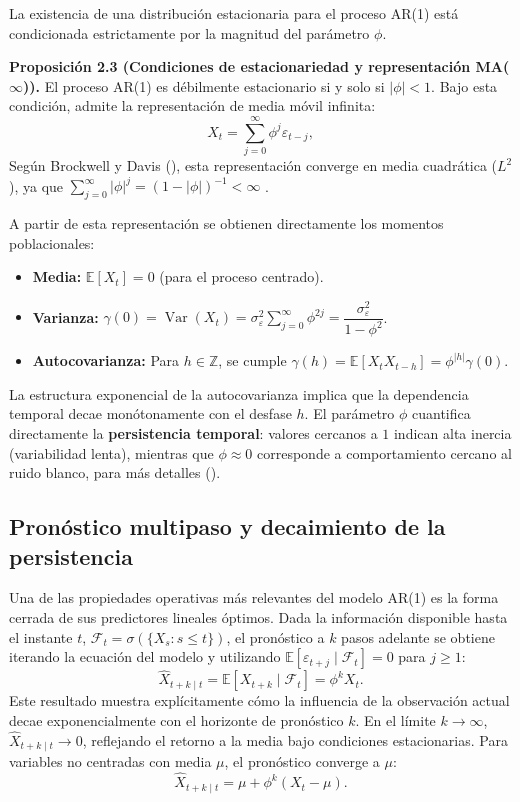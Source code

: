 \documentclass[
  spanish,
  us-letterpaper,
]{scrreprt}
\providecommand{\tightlist}{%
  \setlength{\itemsep}{0pt}\setlength{\parskip}{0pt}}
\numberwithin{equation}{section}
\begin{document}
La existencia de una distribución estacionaria para el proceso AR(1)
está condicionada estrictamente por la magnitud del parámetro \(\phi\).

\textbf{Proposición 2.3 (Condiciones de estacionariedad y representación
MA(\(\infty\))).} El proceso AR(1) es débilmente estacionario si y solo
si \(|\phi| < 1\). Bajo esta condición, admite la representación de
media móvil infinita: \[
X_t = \sum_{j=0}^\infty \phi^j \varepsilon_{t-j},
\] Según Brockwell y Davis (),
esta representación converge en media cuadrática (\(L^2\)), ya que
\(\sum_{j=0}^\infty |\phi|^j = (1-|\phi|)^{-1} < \infty\) .

A partir de esta representación se obtienen directamente los momentos
poblacionales:

\begin{itemize}
\tightlist
\item
  \textbf{Media:} \(\mathbb{E}[X_t] = 0\) (para el proceso centrado).
\item
  \textbf{Varianza:}
  \(\gamma(0) = \operatorname{Var}(X_t) = \sigma_\varepsilon^2 \sum_{j=0}^\infty \phi^{2j} = \dfrac{\sigma_\varepsilon^2}{1-\phi^2}\).
\item
  \textbf{Autocovarianza:} Para \(h \in \mathbb{Z}\), se cumple
  \(\gamma(h) = \mathbb{E}[X_t X_{t-h}] = \phi^{|h|} \gamma(0)\).
\end{itemize}

La estructura exponencial de la autocovarianza implica que la
dependencia temporal decae monótonamente con el desfase \(h\). El
parámetro \(\phi\) cuantifica directamente la \textbf{persistencia
temporal}: valores cercanos a \(1\) indican alta inercia (variabilidad
lenta), mientras que \(\phi \approx 0\) corresponde a comportamiento
cercano al ruido blanco, para más detalles
().

\subsection{Pronóstico multipaso y decaimiento de la
persistencia}\label{pronuxf3stico-multipaso-y-decaimiento-de-la-persistencia}

Una de las propiedades operativas más relevantes del modelo AR(1) es la
forma cerrada de sus predictores lineales óptimos. Dada la información
disponible hasta el instante \(t\),
\(\mathcal{F}_t = \sigma(\{X_s : s \leq t\})\), el pronóstico a \(k\)
pasos adelante se obtiene iterando la ecuación del modelo y utilizando
\(\mathbb{E}[\varepsilon_{t+j} \mid \mathcal{F}_t] = 0\) para
\(j \geq 1\): \[
\hat{X}_{t+k \mid t} = \mathbb{E}[X_{t+k} \mid \mathcal{F}_t] = \phi^k X_t.
\] Este resultado muestra explícitamente cómo la influencia de la
observación actual decae exponencialmente con el horizonte de pronóstico
\(k\). En el límite \(k \to \infty\), \(\hat{X}_{t+k \mid t} \to 0\),
reflejando el retorno a la media bajo condiciones estacionarias. Para
variables no centradas con media \(\mu\), el pronóstico converge a
\(\mu\): \[
\hat{X}_{t+k \mid t} = \mu + \phi^k (X_t - \mu).
\]
\end{document}
